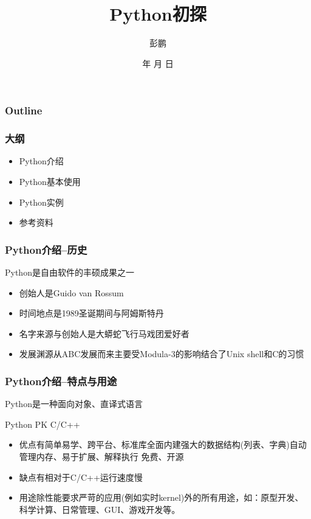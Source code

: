 \documentclass[xcolor=dvipsnames]{beamer}
\renewcommand{\today}{\number\year 年 \number\month 月 \number\day 日}
\begin{document}
\title{Python初探}
\author{彭鹏}

\date{\today}
\begin{frame}
    \titlepage
\end{frame}

\begin{frame}
    \frametitle{Outline}
    \tableofcontents[pausesections]
\end{frame}


\begin{frame}
    \frametitle{大纲}
    \begin{itemize}[<+->]
        \item
            Python介绍
        \item
            Python基本使用
        \item
            Python实例
        \item
            参考资料
    \end{itemize} 
\end{frame}

\begin{frame}
    \frametitle{Python介绍--历史}
    Python是自由软件的丰硕成果之一
    \begin{itemize}[<+->]
        \item 
            \alert{创始人}是Guido van Rossum
        \item
            \alert{时间地点}是1989圣诞期间与阿姆斯特丹
        \item
            \alert{名字来源}与创始人是大蟒蛇飞行马戏团爱好者
        \item
            \alert{发展渊源}从ABC发展而来主要受Modula-3的影响结合了Unix shell和C的习惯
    \end{itemize} 
\end{frame}

\begin{frame}
    \frametitle{Python介绍--特点与用途}
    Python是一种面向对象、直译式语言 
    
    Python PK C/C++
    \begin{itemize}[<+->]
        \item 
            \alert{优点}有简单易学、跨平台、标准库全面内建强大的数据结构(列表、字典)自动管理内存、易于扩展、解释执行 免费、开源
        \item
            \alert{缺点}有相对于C/C++运行速度慢
        \item
            \alert{用途}除性能要求严苛的应用(例如实时kernel)外的所有用途，如：原型开发、科学计算、日常管理、GUI、游戏开发等。
    \end{itemize} 
\end{frame}
\end{document}
